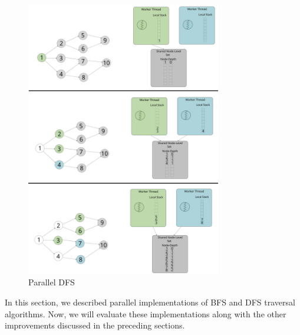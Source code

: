 \begin{figure}[ht]
    \centering
    \includegraphics[width=0.76\textwidth]{figures/parallelDFS.png}
    \caption{Parallel DFS}
    \label{fig:parallelDFS}
\end{figure}

\smallskip
In this section, we described parallel implementations of BFS and DFS traversal
algorithms. Now, we will evaluate these implementations along with the other
improvements discussed in the preceding sections.
